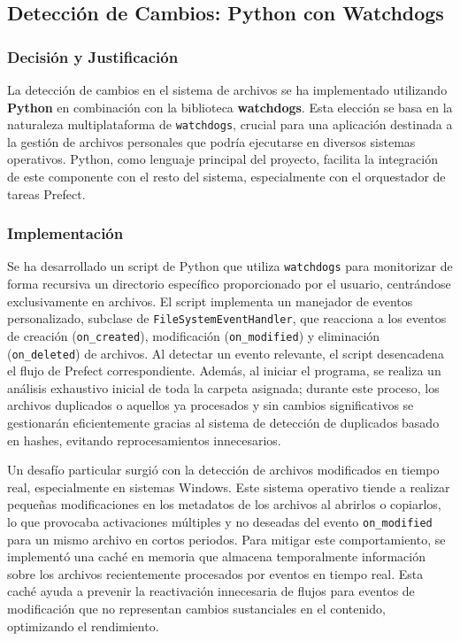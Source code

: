 \subsection{Detección de Cambios: Python con Watchdogs}
\label{subsec:decision_watchdogs}
\subsubsection{Decisión y Justificación}
La detección de cambios en el sistema de archivos se ha implementado utilizando \textbf{Python} en combinación con la biblioteca \textbf{watchdogs}. Esta elección se basa en la naturaleza multiplataforma de \texttt{watchdogs}, crucial para una aplicación destinada a la gestión de archivos personales que podría ejecutarse en diversos sistemas operativos. Python, como lenguaje principal del proyecto, facilita la integración de este componente con el resto del sistema, especialmente con el orquestador de tareas Prefect.

\subsubsection{Implementación}
Se ha desarrollado un script de Python que utiliza \texttt{watchdogs} para monitorizar de forma recursiva un directorio específico proporcionado por el usuario, centrándose exclusivamente en archivos. El script implementa un manejador de eventos personalizado, subclase de \texttt{FileSystemEventHandler}, que reacciona a los eventos de creación (\texttt{on\_created}), modificación (\texttt{on\_modified}) y eliminación (\texttt{on\_deleted}) de archivos. Al detectar un evento relevante, el script desencadena el flujo de Prefect correspondiente. Además, al iniciar el programa, se realiza un análisis exhaustivo inicial de toda la carpeta asignada; durante este proceso, los archivos duplicados o aquellos ya procesados y sin cambios significativos se gestionarán eficientemente gracias al sistema de detección de duplicados basado en hashes, evitando reprocesamientos innecesarios.

Un desafío particular surgió con la detección de archivos modificados en tiempo real, especialmente en sistemas Windows. Este sistema operativo tiende a realizar pequeñas modificaciones en los metadatos de los archivos al abrirlos o copiarlos, lo que provocaba activaciones múltiples y no deseadas del evento \texttt{on\_modified} para un mismo archivo en cortos periodos. Para mitigar este comportamiento, se implementó una caché en memoria que almacena temporalmente información sobre los archivos recientemente procesados por eventos en tiempo real. Esta caché ayuda a prevenir la reactivación innecesaria de flujos para eventos de modificación que no representan cambios sustanciales en el contenido, optimizando el rendimiento.

